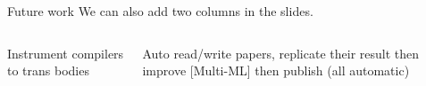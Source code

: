 \documentclass[aspectratio=169,xcolor=dvipsnames]{beamer}
\begin{document}


\begin{frame}{Future work}
	We can also add two columns in the slides.
	\begin{columns}[t]
		\begin{column}[T]{0.4\textwidth}
			Instrument compilers to trans bodies
			\vspace{1em}
		\end{column}
		\begin{column}[T]{0.4\textwidth}
			Auto read/write papers, replicate their result then improve [Multi-ML] then publish (all automatic)
		\end{column}
	\end{columns}
\end{frame}
\end{document}

